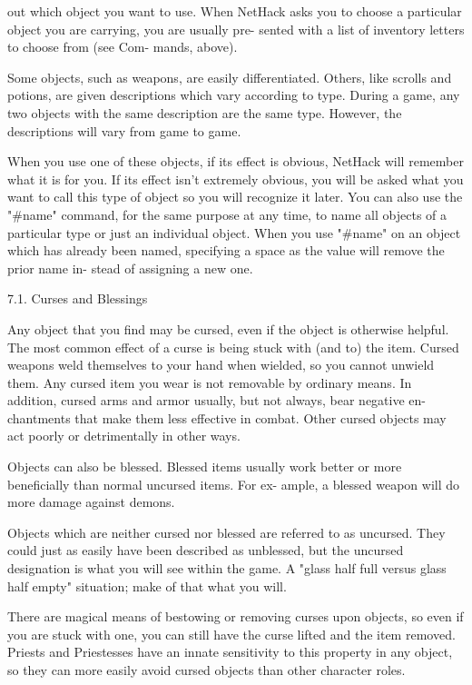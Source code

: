 \documentclass[11pt]{article}
\begin{document}
out which object you want to use.  When NetHack asks you to
choose a particular object you are carrying, you are usually pre-
sented with a list of inventory letters to choose from (see Com-
mands, above).

   Some objects, such as weapons, are easily differentiated.
Others, like scrolls and potions, are given descriptions which
vary according to type. During a game, any two objects with the
same description are the same type.  However, the descriptions
will vary from game to game.

   When you use one of these objects, if its effect is obvious,
NetHack will remember what it is for you. If its effect isn't
extremely obvious, you will be asked what you want to call this
type of object so you will recognize it later. You can also use
the "\#name" command, for the same purpose at any time, to name
all objects of a particular type or just an individual object.
When you use "\#name" on an object which has already been named,
specifying a space as the value will remove the prior name in-
stead of assigning a new one.

7.1. Curses and Blessings

   Any object that you find may be cursed, even if the object
is otherwise helpful. The most common effect of a curse is being
stuck with (and to) the item. Cursed weapons weld themselves to
your hand when wielded, so you cannot unwield them.  Any cursed
item you wear is not removable by ordinary means. In addition,
cursed arms and armor usually, but not always, bear negative en-
chantments that make them less effective in combat. Other cursed
objects may act poorly or detrimentally in other ways.

   Objects can also be blessed.  Blessed items usually work
better or more beneficially than normal uncursed items. For ex-
ample, a blessed weapon will do more damage against demons.

   Objects which are neither cursed nor blessed are referred to
as uncursed.  They could just as easily have been described as
unblessed, but the uncursed designation is what you will see
within the game.  A "glass half full versus glass half empty"
situation; make of that what you will.

   There are magical means of bestowing or removing curses upon
objects, so even if you are stuck with one, you can still have
the curse lifted and the item removed. Priests and Priestesses
have an innate sensitivity to this property in any object, so
they can more easily avoid cursed objects than other character
roles.
\end{document}
